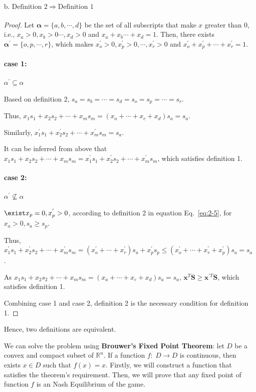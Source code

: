 \documentclass[oneside,solution]{seu-ml-assign}
\begin{document}
\paragraph{\(\text{b. Definition }2\Rightarrow \text{Definition } 1\)}
\begin{proof}
    

Let \(\mathbf{\alpha}=\{a,b,\cdots,d\} \) be the set of all subscripts
that make \(x\) greater than \(0\), i.e., \(x_a>0,x_b>0\cdots,x_d>0\)
and \(x_a+x_b\cdots+x_d=1\). Then, there exists
\(\mathbf{\alpha}^{'}=\{o,p,\cdots,r\} \), which makes
\(x_o^{'}>0,x_p^{'}>0,\cdots,x_r^{'}>0\) and
\(x_o^{'}+x_p^{'}+\cdots+x_r^{'}=1\).

\paragraph{case 1: }\(\alpha^{'} \subseteq \alpha\)

Based on definition 2, \(s_a=s_b=\cdots=s_d=s_o=s_p=\cdots=s_r\).

Thus, \(x_1s_1+x_2s_2+\cdots+x_ms_m=(x_a+\cdots+x_c+x_d)s_a=s_a\).

Similarly, \(x_1^{'}s_1+x_2^{'}s_2+\cdots+x_m^{'}s_m=s_a\).

It can be inferred from above that
\(x_1s_1+x_2s_2+\cdots+x_ms_m=x_1^{'}s_1+x_2^{'}s_2+\cdots+x_m^{'}s_m\),
which satisfies definition 1.

\paragraph{case 2: }\(\alpha^{'}\not\subseteq \alpha\)

\(\exist x_p=0 ,x_p^{'} > 0\), according to definition 2 in equation Eq.~\eqref{eq:2-5}, for \(x_a>0,s_a\geq s_p\).

Thus,
\(x_1^{'}s_1+x_2^{'}s_2+\cdots+x_m^{'}s_m=(x_o^{'}+\cdots+x_r^{'})s_a+x_p^{'}s_p\leq(x_o^{'}+\cdots+x_r^{'}+x_p^{'})s_a=s_a\).

As \(x_1s_1+x_2s_2+\cdots+x_ms_m=(x_a+\cdots+x_c+x_d)s_a=s_a\),
\(\mathbf{x}^{T}\mathbf{S}\geq\mathbf{x}^{'T}\mathbf{S}\), which
satisfies definition 1.


Combining case 1 and case 2, definition 2 is the necessary condition for
definition 1.
\end{proof}
Hence, two definitions are equivalent.

We can solve the problem using \textbf{Brouwer's Fixed Point Theorem}:
let \(D\) be a convex and compact subset of \(\mathbb{R}^n\). If a
function \(f:\;D\rightarrow D\) is continuous, then exists \(x\in D\)
such that \(f(x) = x\). Firstly, we will construct a function that
satisfies the theorem's requirement. Then, we will prove that any fixed
point of function \(f\) is an Nash Equilibrium of the game.
\end{document}
